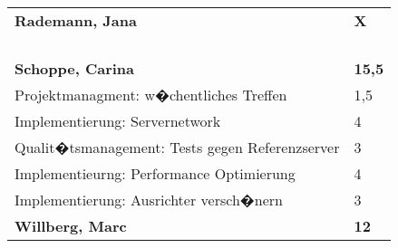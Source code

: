 \documentclass[a4paper,11pt]{scrartcl}
\begin{document}
\begin{longtable}{| p{13.8cm} | C{2.4cm} |}

	&

	\\
	\hline
	\hline


	\textbf{Rademann, Jana} & \textbf{X}\\ %
	\hline


	&

	\\
	\hline


	&

	\\
	\hline


	&

	\\
	\hline


	&

	\\
	\hline
	\hline


	\textbf{Schoppe, Carina} & \textbf{15,5}\\ %
	\hline

  Projektmanagment: w�chentliches Treffen
	&
  1,5
	\\
	\hline

  Implementierung: Servernetwork
	&
  4
	\\
	\hline

  Qualit�tsmanagement: Tests gegen Referenzserver
	&
  3
	\\
	\hline

  Implementieurng: Performance Optimierung
	&
  4
	\\
	\hline

  Implementierung: Ausrichter versch�nern
	&
  3
	\\
	\hline
	\hline


	\textbf{Willberg, Marc} & \textbf{12}\\ %
	\hline


\end{longtable}
\end{document}
